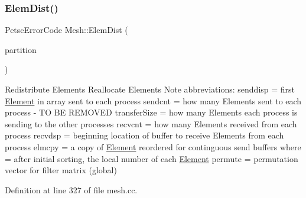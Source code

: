 \subsubsection{\texorpdfstring{Elem\+Dist()}{ElemDist()}}
{\footnotesize\ttfamily Petsc\+Error\+Code Mesh\+::\+Elem\+Dist (\begin{DoxyParamCaption}\item[{Eigen\+::\+Array$<$ Petsc\+Int, -\/1, 1 $>$ \&}]{partition }\end{DoxyParamCaption})\hspace{0.3cm}{\ttfamily [protected]}}

Redistribute Elements Reallocate Elements Note abbreviations\+: senddisp = first \mbox{\hyperlink{class_element}{Element}} in array sent to each process sendcnt = how many Elements sent to each process -\/ TO BE R\+E\+M\+O\+V\+ED transfer\+Size = how many Elements each process is sending to the other processes recvcnt = how many Elements received from each process recvdsp = beginning location of buffer to receive Elements from each process elmcpy = a copy of \mbox{\hyperlink{class_element}{Element}} reordered for continguous send buffers where = after initial sorting, the local number of each \mbox{\hyperlink{class_element}{Element}} permute = permutation vector for filter matrix (global) 

Definition at line 327 of file mesh.\+cc.


